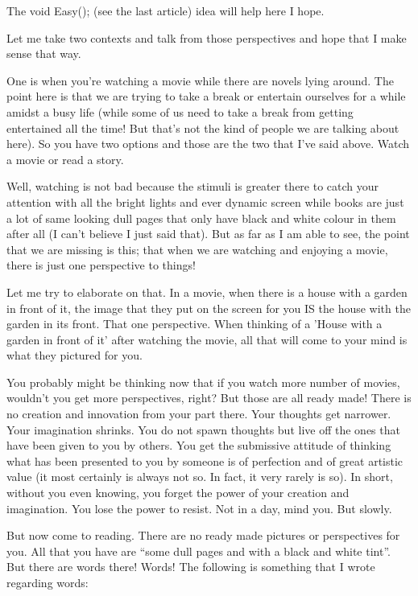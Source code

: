 \documentclass[twoside,11pt]{article}
\begin{document}
The void Easy(); (see the last article) idea will help here I hope.

Let me take two contexts and talk from those perspectives and hope that I make sense that way.

One is when you're watching a movie while there are novels lying around. The point here is that we are trying to take a break or entertain ourselves for a while amidst a busy life (while some of us need to take a break from getting entertained all the time! But that's not the kind of people we are talking about here). So you have two options and those are the two that I've said above. Watch a movie or read a story.

Well, watching is not bad because the stimuli is greater there to catch your attention with all the bright lights and ever dynamic screen while books are just a lot of same looking dull pages that only have black and white colour in them after all (I can't believe I just said that). But as far as I am able to see, the point that we are missing is this; that when we are watching and enjoying a movie, there is just one perspective to things!

Let me try to elaborate on that. In a movie, when there is a house with a garden in front of it, the image that they put on the screen for you IS the house with the garden in its front. That one perspective. When thinking of a 'House with a garden in front of it' after watching the movie, all that will come to your mind is what they pictured for you.

You probably might be thinking now that if you watch more number of movies, wouldn't you get more perspectives, right? But those are all ready made! There is no creation and innovation from your part there. Your thoughts get narrower. Your imagination shrinks. You do not spawn thoughts but live off the ones that have been given to you by others. You get the submissive attitude of thinking what has been presented to you by someone is of perfection and of great artistic value (it most certainly is always not so. In fact, it very rarely is so). In short, without you even knowing, you forget the power of your creation and imagination. You lose the power to resist. Not in a day, mind you. But slowly.

But now come to reading. There are no ready made pictures or perspectives for you. All that you have are ``some dull pages and with a black and white tint''. But there are words there! Words! The following is something that I wrote regarding words:
\end{document}
